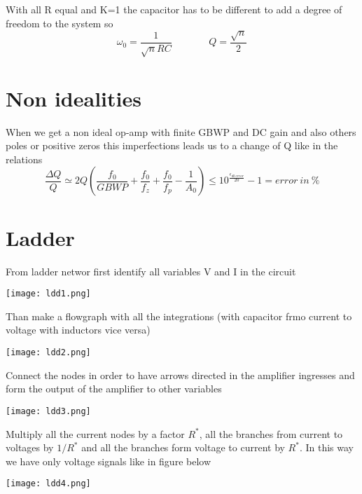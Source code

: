 With all R equal and K=1 the capacitor has to be different to add a degree of freedom to the system so
\begin{equation}
\omega_0=\frac{1}{\sqrt{n}RC}\ \ \ \ \ \ \ \ \ \ \ \ \ \ \ \ \ Q=\frac{\sqrt{n}}{2}
\end{equation}


\section{Non idealities}
When we get a non ideal op-amp with finite GBWP and DC gain and also others poles or positive zeros this imperfections leads us to a change of Q like in the relations 
\begin{equation}
\frac{\Delta Q}{Q}\simeq 2Q\left(\frac{f_0}{GBWP}+\frac{f_0}{f_z}+\frac{f_0}{f_p}-\frac{1}{A_0}\right) \le 10^{\frac{\epsilon_{db \ error}}{20}}-1= error \ in \ \%
\end{equation}

\section{Ladder}

From ladder networ first identify all variables V and I in the circuit 

\centering
\texttt{[image: ldd1.png]}\\
\raggedright

Than make a flowgraph with all the integrations (with capacitor frmo current to voltage with inductors vice versa)

\centering
\texttt{[image: ldd2.png]}\\
\raggedright

Connect the nodes in order to have arrows directed in the amplifier ingresses and form the output of the amplifier to other variables

\centering
\texttt{[image: ldd3.png]}\\
\raggedright

Multiply all the current nodes by a factor $R^*$, all the branches from current to voltages by $1/R^*$ and all the branches form voltage to current by $R^*$. In this way we have only voltage signals like in figure below

\centering
\texttt{[image: ldd4.png]}\\
\raggedright

